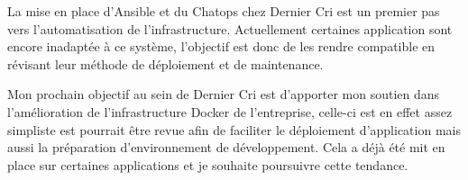 \documentclass[12pt,a4paper]{article}
\begin{document}
  La mise en place d'Ansible et du Chatops chez Dernier Cri est un premier
  pas vers l'automatisation de l'infrastructure. Actuellement certaines
  application sont encore inadaptée à ce système, l'objectif est donc de
  les rendre compatible en révisant leur méthode de déploiement et de
  maintenance.

  \bigskip

  Mon prochain objectif au sein de Dernier Cri est d'apporter mon soutien
  dans l'amélioration de l'infrastructure Docker de l'entreprise, celle-ci
  est en effet assez simpliste est pourrait être revue afin de faciliter
  le déploiement d'application mais aussi la préparation d'environnement
  de développement. Cela a déjà été mit en place sur certaines
  applications et je souhaite poursuivre cette tendance.
\end{document}
